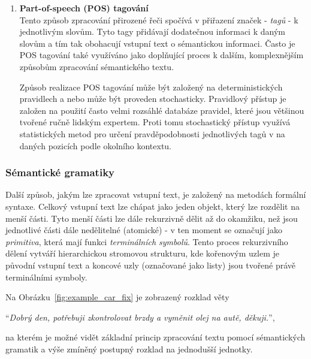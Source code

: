 \begin{enumerate}
	\item \textbf{Part-of-speech (POS) tagování}\\
	      Tento způsob zpracování přirozené řeči spočívá v přiřazení značek - \emph{tagů} - k jednotlivým slovům.
	      Tyto tagy přidávají dodatečnou informaci k daným slovům a tím tak obohacují vstupní text o sémantickou informaci.
	      Často je POS tagování také využíváno jako doplňující proces k dalším, komplexnějším způsobům zpracování sémantického textu.~\cite{the_conversational_interface}

	      Způsob realizace POS tagování může být založený na deterministických pravidlech a nebo může být proveden stochasticky.
	      Pravidlový přístup je založen na použití často velmi rozsáhlé databáze pravidel, které jsou většinou tvořené ručně lidským expertem.
	      Proti tomu stochastický přístup využívá statistických metod pro určení pravděpodobnosti jednotlivých tagů v na daných pozicích
	      podle okolního kontextu.~\cite{the_conversational_interface}
\end{enumerate}

\subsubsection{Sémantické gramatiky}\label{subsubsec:grammars}
Další způsob, jakým lze zpracovat vstupní text, je založený na metodách formální syntaxe.
Celkový vstupní text lze chápat jako jeden objekt, který lze rozdělit na menší části.
Tyto menší části lze dále rekurzivně dělit až do okamžiku, než jsou jednotlivé části dále nedělitelné (atomické) - v ten moment se označují jako \emph{primitiva},
která mají funkci \emph{terminálních symbolů}.
Tento proces rekurzivního dělení vytváří hierarchickou stromovou strukturu, kde kořenovým uzlem je původní vstupní text a
koncové uzly (označované jako listy) jsou tvořené právě terminálními symboly.~\cite{PsutkaJ_2006_Mluvimes}

Na Obrázku~\ref{fig:example_car_fix} je zobrazený rozklad věty
\begin{center}
	\enquote{\emph{Dobrý den, potřebuji zkontrolovat brzdy a vyměnit olej na autě, děkuji.}},
\end{center}
na kterém je možné vidět základní princip zpracování textu pomocí sémantických gramatik a výše zmíněný postupný rozklad na jednodušší jednotky.

